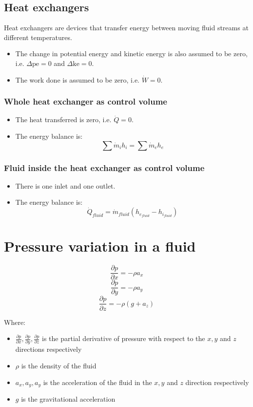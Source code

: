 \documentclass[11pt]{article}
\begin{document}
\subsection{Heat exchangers}
\label{sec:org103365a}
Heat exchangers are devices that transfer energy between moving fluid streams at different temperatures.
\begin{itemize}
\item The change in potential energy and kinetic energy is also assumed to be zero, i.e. \(\Delta \text{pe} = 0\) and \(\Delta \text{ke} = 0\).
\item The work done is assumed to be zero, i.e. \(\dot{W} = 0\).
\end{itemize}
\subsubsection{Whole heat exchanger as control volume}
\label{sec:orgc89a80e}
\begin{itemize}
\item The heat transferred is zero, i.e. \(\dot{Q} = 0\).
\item The energy balance is:
\[\sum \dot{m}_i h_i = \sum \dot{m}_e h_e\]
\end{itemize}
\subsubsection{Fluid inside the heat exchanger as control volume}
\label{sec:org4195b6d}
\begin{itemize}
\item There is one inlet and one outlet.
\item The energy balance is:
\[\dot{Q}_{fluid} = \dot{m}_{fluid} \left(h_{e_{fluid}} - h_{i_{fluid}} \right)\]
\end{itemize}
\section{Pressure variation in a fluid}
\label{sec:org980b0a6}
\[\frac{\partial p}{\partial x} = - \rho a_x\]
\[\frac{\partial p}{\partial y} = - \rho a_y\]
\[\frac{\partial p}{\partial z} = - \rho (g + a_z)\]

Where:
\begin{itemize}
\item \(\frac{\partial p}{\partial x}, \frac{\partial p}{\partial y}, \frac{\partial p}{\partial z}\) is the partial derivative of pressure with respect to the \(x, y\) and \(z\) directions respectively
\item \(\rho\) is the density of the fluid
\item \(a_x, a_y, a_y\) is the acceleration of the fluid in the \(x, y\) and \(z\) direction respectively
\item \(g\) is the gravitational acceleration
\end{itemize}
\end{document}
